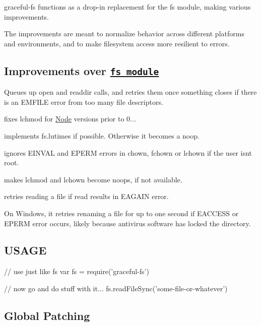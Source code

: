 graceful-\/fs functions as a drop-\/in replacement for the fs module, making various improvements.

The improvements are meant to normalize behavior across different platforms and environments, and to make filesystem access more resilient to errors.

\subsection*{Improvements over \href{https://nodejs.org/api/fs.html}{\tt fs module}}


\begin{DoxyItemize}
\item Queues up {\ttfamily open} and {\ttfamily readdir} calls, and retries them once something closes if there is an E\+M\+F\+I\+LE error from too many file descriptors.
\item fixes {\ttfamily lchmod} for \mbox{\hyperlink{classNode}{Node}} versions prior to 0...
\item implements {\ttfamily fs.\+lutimes} if possible. Otherwise it becomes a noop.
\item ignores {\ttfamily E\+I\+N\+V\+AL} and {\ttfamily E\+P\+E\+RM} errors in {\ttfamily chown}, {\ttfamily fchown} or {\ttfamily lchown} if the user isn\textquotesingle{}t root.
\item makes {\ttfamily lchmod} and {\ttfamily lchown} become noops, if not available.
\item retries reading a file if {\ttfamily read} results in E\+A\+G\+A\+IN error.
\end{DoxyItemize}

On Windows, it retries renaming a file for up to one second if {\ttfamily E\+A\+C\+C\+E\+SS} or {\ttfamily E\+P\+E\+RM} error occurs, likely because antivirus software has locked the directory.

\subsection*{U\+S\+A\+GE}


\begin{DoxyCode}
// use just like fs
var fs = require('graceful-fs')

// now go and do stuff with it...
fs.readFileSync('some-file-or-whatever')
\end{DoxyCode}


\subsection*{Global Patching}

